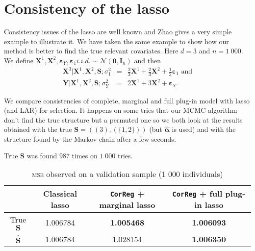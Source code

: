 \documentclass[12pt,a4paper]{report}
\begin{document}
			
	

	\section{Consistency of the {\sc lasso}}\label{consistency}
		Consistency issues of the {\sc lasso} are well known and Zhao \cite{Zhao2006MSC} gives a very simple example to illustrate it.
		We have taken the same example to show how our method is better to find the true relevant covariates.
		Here $d=3$ and $n=1\;000$.\\
		We define $\boldsymbol{X}^1,\boldsymbol{X}^2, \boldsymbol{\varepsilon}_Y, \boldsymbol{\varepsilon}_{1} i.i.d. \sim \mathcal{N}(\boldsymbol{0},\boldsymbol{I}_n)$ and then \\
		\begin{eqnarray}
		\boldsymbol{X}^3|\boldsymbol{X}^1,\boldsymbol{X}^2,\boldsymbol{S};\sigma_1^2&=&\frac{2}{3}\boldsymbol{X}^1+\frac{2}{3}\boldsymbol{X}^2+\frac{1}{3}\boldsymbol{\varepsilon}_1 \textrm{ and} \\
		\boldsymbol{Y}|\boldsymbol{X}^1,\boldsymbol{X}^2,\boldsymbol{S};\sigma_Y^2&=&2\boldsymbol{X}^1+3\boldsymbol{X}^2+\boldsymbol{\varepsilon}_Y.
		\end{eqnarray}
		
		
		We compare consistencies of complete, marginal and full plug-in model with {\sc lasso} (and LAR) for selection.
		It happens on some tries that our MCMC algorithm don't find the true structure but a permuted one so we both look at the results obtained with the true $\boldsymbol{S}=((3),(\{1,2\}))$ (but $\hat{\boldsymbol{\alpha}}$ is used) and with the structure found by the Markov chain after a few seconds.
		
		True $\boldsymbol{S}$ was found $987$ times on $1\;000$ tries.\\%
		
		\begin{table}[h!]
		\centering
		\begin{tabular}{|c|c|c|c|}
		\hline 
		 & Classical {\sc lasso} & {\tt CorReg} + marginal {\sc lasso}& {\tt CorReg} + full plug-in {\sc lasso}\\ 
		\hline 
		True $\boldsymbol{S}$ &  1.006784 & \textbf{1.005468} & \textbf{1.006093} \\ 
		\hline 
		$\hat{\boldsymbol{S}}$ & 1.006784 & 1.028154 & \textbf{1.006350} \\ 
		\hline 
		\end{tabular} 
		\caption{\textsc{mse} observed on a validation sample (1 000 individuals)}
		\end{table}
\end{document}
